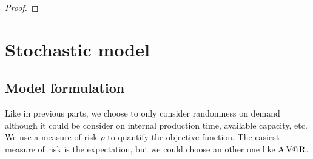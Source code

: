 \begin{proof}
\tbc
\end{proof}





\section{Stochastic model}

\subsection{Model formulation}

Like in previous parts, we choose to only consider randomness on demand although it could be consider on internal production time, available capacity, etc. We use a measure of risk $\rho$ to quantify the objective function. The easiest measure of risk is the expectation, but we could choose an other one like $\operatorname{A\operatorname{V@R}}$.

